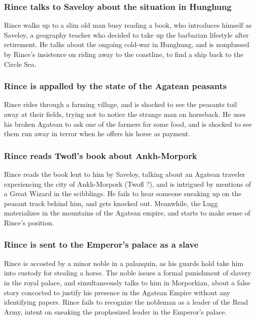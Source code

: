 \subsubsection{\Gls{Rince} talks to \Gls{Saveloy} about the situation in Hunghung}
\Gls{Rince} walks up to a slim old man busy reading a book, who introduces himself as \Gls{Saveloy},
a geography teacher who decided to take up the barbarian lifestyle after retirement. He talks about
the ongoing cold-war in Hunghung, and is nonplussed by \Gls{Rince}'s insistence on riding away to
the coastline, to find a ship back to the Circle Sea.

\subsubsection{\Gls{Rince} is appalled by the state of the Agatean peasants}
\Gls{Rince} rides through a farming village, and is shocked to see the peasants toil away at their
fields, trying not to notice the strange man on horseback. He uses his broken Agatean to ask one
of the farmers for some food, and is shocked to see them run away in terror when he offers his horse
as payment.

\subsubsection{\Gls{Rince} reads \Gls{Twofl}'s book about Ankh-Morpork}
\Gls{Rince} reads the book lent to him by \Gls{Saveloy}, talking about an Agatean traveler
experiencing the city of Ankh-Morpork (\Gls{Twofl} ?), and is intrigued by mentions of a Great
Wizard in the scibblings. He fails to hear someone sneaking up on the peasant track behind him, and
gets knocked out. Meanwhile, the \Gls{Lugg} materializes in the mountains of the Agatean empire, and
starts to make sense of \Gls{Rince}'s position.

\subsubsection{\Gls{Rince} is sent to the Emperor's palace as a slave}
\Gls{Rince} is accosted by a minor noble in a palanquin, as his guards hold take him into custody
for stealing a horse. The noble issues a formal punishment of slavery in the royal palace, and
simultaneously talks to him in Morporkian, about a false story concocted to justify his presence in
the Agatean Empire without any identifying papers. \Gls{Rince} fails to recognize the nobleman as a
leader of the Read Army, intent on sneaking the prophesized leader in the Emperor's palace.

